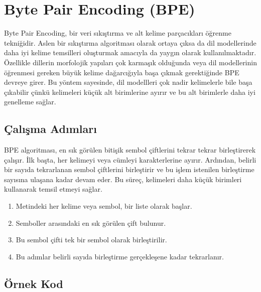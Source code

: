 \section{Byte Pair Encoding (BPE)}

Byte Pair Encoding, bir veri sıkıştırma ve alt kelime parçacıkları öğrenme tekniğidir. Aslen bir sıkıştırma algoritması olarak ortaya çıksa da dil modellerinde daha iyi kelime temsilleri oluşturmak amacıyla da yaygın olarak kullanılmaktadır. Özellikle dillerin morfolojik yapıları çok karmaşık olduğunda veya dil modellerinin öğrenmesi gereken büyük kelime dağarcığıyla başa çıkmak gerektiğinde BPE devreye girer. Bu yöntem sayesinde, dil modellleri çok nadir kelimelerle bile başa çıkabilir çünkü kelimeleri küçük alt birimlerine ayırır ve bu alt birimlerle daha iyi genelleme sağlar. 

\subsection{Çalışma Adımları}

BPE algoritması, en sık görülen bitişik sembol çiftlerini tekrar tekrar birleştirerek çalışır. İlk başta, her kelimeyi veya cümleyi karakterlerine ayırır. Ardından, belirli bir sayıda tekrarlanan sembol çiftlerini birleştirir ve bu işlem istenilen birleştirme sayısına ulaşana kadar devam eder. Bu süreç, kelimeleri daha küçük birimleri kullanarak temsil etmeyi sağlar.

\begin{enumerate}
    \item Metindeki her kelime veya sembol, bir liste olarak başlar.
    \item Semboller arasındaki en sık görülen çift bulunur.
    \item Bu sembol çifti tek bir sembol olarak birleştirilir.
    \item Bu adımlar belirli sayıda birleştirme gerçekleşene kadar tekrarlanır.
\end{enumerate}

\subsection{Örnek Kod}

